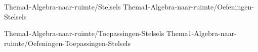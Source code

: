 




%





\FVDchapterpair
  {Thema1-Algebra-naar-ruimte/Stelsels}
  {Thema1-Algebra-naar-ruimte/Oefeningen-Stelsels}

  \FVDchapterpair
  {Thema1-Algebra-naar-ruimte/Toepassingen-Stelsels}
  {Thema1-Algebra-naar-ruimte/Oefeningen-Toepassingen-Stelsels}























